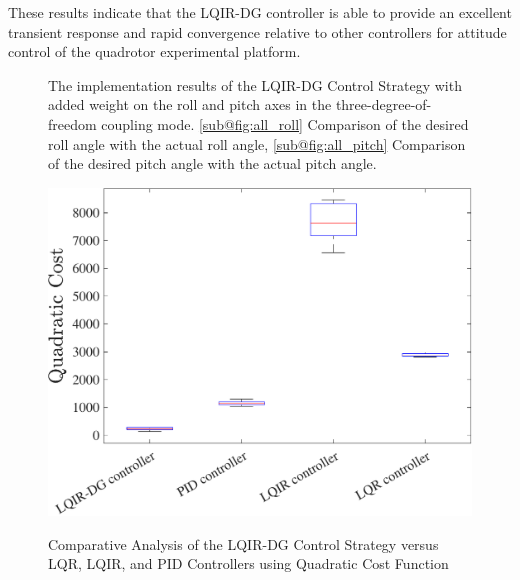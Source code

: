 \documentclass[3p,times]{elsarticle}
\begin{document}
These results indicate that the LQIR-DG controller is able to provide an excellent transient response and rapid convergence relative to other controllers for attitude control of the quadrotor experimental platform.



\begin{figure}[H]
	\centering
	\caption{The implementation results of the LQIR-DG Control Strategy with added weight on the roll and pitch axes in the three-degree-of-freedom coupling mode. \ref{sub@fig:all_roll} Comparison of the desired roll angle with the actual roll angle, \ref{sub@fig:all_pitch} Comparison of the desired pitch angle with the actual pitch angle.}
	\label{fig:compare}
\end{figure}

\begin{figure}[H]
	\centering
	{\includegraphics[width=.49\linewidth]{../Figure/implementation/box_plot/lqidgvsboxplot}
	}
	\caption{Comparative Analysis of the LQIR-DG Control Strategy versus LQR, LQIR, and PID Controllers using Quadratic Cost Function}
	\label{fig:compare_boxplot}
\end{figure}
\end{document}
